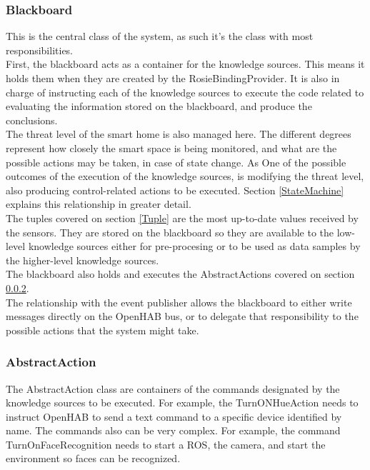 \subsubsection{Blackboard}
This is the central class of the system, as such it's the class with most responsibilities.\\
First, the blackboard acts as a container for the knowledge sources. This means it holds them when they are created by the RosieBindingProvider. It is also in charge of instructing each of the knowledge sources to execute the code related to evaluating the information stored on the blackboard, and produce the conclusions.\\
The threat level of the smart home is also managed here. The different degrees represent how closely the smart space is being monitored, and what are the possible actions may be taken, in case of state change. As One of the possible outcomes of the execution of the knowledge sources, is modifying the threat level, also producing control-related actions to be executed. Section \ref{StateMachine} explains this relationship in greater detail.\\
The tuples covered on section \ref{Tuple} are the most up-to-date values received by the sensors. They are stored on the blackboard so they are available to the low-level knowledge sources either for pre-procesing or to be used as data samples by the higher-level knowledge sources.\\
The blackboard also holds and executes the AbstractActions covered on section \ref{AbstractAction}.\\
The relationship with the event publisher allows the blackboard to either write messages directly on the OpenHAB bus, or to delegate that responsibility to the possible actions that the system might take.\\


\textsl{}\subsubsection{AbstractAction}
\label{AbstractAction}
The AbstractAction class are containers of the commands designated by the knowledge sources to be executed. For example, the TurnONHueAction needs to instruct OpenHAB to send a text command to a specific device identified by name. The commands also can be very complex. For example, the command TurnOnFaceRecognition needs to start a ROS, the camera, and start the environment so faces can be recognized.

